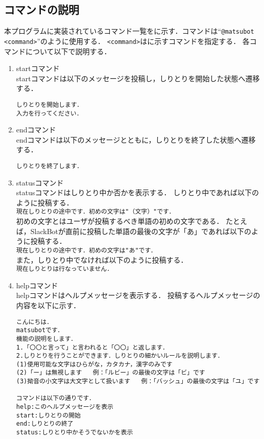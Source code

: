 \documentclass[12pt]{jsarticle}
\begin{document}
\subsection{コマンドの説明}
本プログラムに実装されているコマンド一覧をに示す．コマンドは``\verb|@matsubot <command>|''のように使用する．
\verb|<command>|はに示すコマンドを指定する．
各コマンドについて以下で説明する．
\begin{enumerate}
\item startコマンド\\
startコマンドは以下のメッセージを投稿し，しりとりを開始した状態へ遷移する．
\begin{verbatim}
しりとりを開始します．
入力を行ってください．
\end{verbatim}
\item endコマンド\\
endコマンドは以下のメッセージとともに，しりとりを終了した状態へ遷移する．
\begin{verbatim}
しりとりを終了します．
\end{verbatim}
\item statusコマンド\\
statusコマンドはしりとり中か否かを表示する．
しりとり中であれば以下のように投稿する．\\
\verb|現在しりとりの途中です．初めの文字は"（文字）"です．|\\
初めの文字とはユーザが投稿するべき単語の初めの文字である．
たとえば，SlackBotが直前に投稿した単語の最後の文字が「あ」であれば以下のように投稿する．\\
\verb|現在しりとりの途中です．初めの文字は"あ"です．|\\
また，しりとり中でなければ以下のように投稿する．\\
\verb|現在しりとりは行なっていません．|\\
\item helpコマンド\\
helpコマンドはヘルプメッセージを表示する．
投稿するヘルプメッセージの内容を以下に示す．
\begin{verbatim}
こんにちは．
matsubotです．
機能の説明をします．
1.「〇〇と言って」と言われると「〇〇」と返します．
2.しりとりを行うことができます．しりとりの細かいルールを説明します．
(1)使用可能な文字はひらがな，カタカナ，漢字のみです
(2)「ー」は無視します   例：「ルビー」の最後の文字は「ビ」です
(3)拗音の小文字は大文字として扱います   例：「バッシュ」の最後の文字は「ユ」です

コマンドは以下の通りです．
help:このヘルプメッセージを表示
start:しりとりの開始
end:しりとりの終了
status:しりとり中かそうでないかを表示
\end{verbatim}
\end{enumerate}
\end{document}
